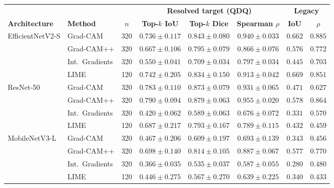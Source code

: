 \begin{tabular}{ll c ccc cc}
\toprule
 & & & \multicolumn{3}{c}{\textbf{Resolved target (QDQ)}} & \multicolumn{2}{c}{\textbf{Legacy}} \\
\cmidrule(lr){4-6} \cmidrule(lr){7-8}
\textbf{Architecture} & \textbf{Method} & \textbf{$n$} & \textbf{Top-$k$ IoU} & \textbf{Top-$k$ Dice} & \textbf{Spearman $\rho$} & \textbf{IoU} & \textbf{$\rho$} \\
\midrule
\multirow{4}{*}{EfficientNetV2-S}
 & Grad-CAM & 320 & $0.736 \pm 0.117$ & $0.843 \pm 0.080$ & $0.940 \pm 0.033$ & $0.662$ & $0.885$ \\
 & Grad-CAM++ & 320 & $0.667 \pm 0.106$ & $0.795 \pm 0.079$ & $0.866 \pm 0.076$ & $0.576$ & $0.772$ \\
 & Int.\ Gradients & 320 & $0.550 \pm 0.041$ & $0.709 \pm 0.034$ & $0.797 \pm 0.034$ & $0.445$ & $0.703$ \\
 & LIME & 120 & $0.742 \pm 0.205$ & $0.834 \pm 0.150$ & $0.913 \pm 0.042$ & $0.669$ & $0.851$ \\
\midrule
\multirow{4}{*}{ResNet-50}
 & Grad-CAM & 320 & $0.783 \pm 0.110$ & $0.873 \pm 0.079$ & $0.931 \pm 0.065$ & $0.471$ & $0.627$ \\
 & Grad-CAM++ & 320 & $0.790 \pm 0.094$ & $0.879 \pm 0.063$ & $0.955 \pm 0.020$ & $0.578$ & $0.864$ \\
 & Int.\ Gradients & 320 & $0.420 \pm 0.062$ & $0.589 \pm 0.063$ & $0.676 \pm 0.072$ & $0.331$ & $0.570$ \\
 & LIME & 120 & $0.687 \pm 0.217$ & $0.793 \pm 0.167$ & $0.789 \pm 0.115$ & $0.432$ & $0.459$ \\
\midrule
\multirow{4}{*}{MobileNetV3-L}
 & Grad-CAM & 320 & $0.467 \pm 0.206$ & $0.609 \pm 0.197$ & $0.693 \pm 0.139$ & $0.343$ & $0.456$ \\
 & Grad-CAM++ & 320 & $0.698 \pm 0.140$ & $0.814 \pm 0.105$ & $0.887 \pm 0.067$ & $0.577$ & $0.770$ \\
 & Int.\ Gradients & 320 & $0.366 \pm 0.035$ & $0.535 \pm 0.037$ & $0.587 \pm 0.055$ & $0.280$ & $0.480$ \\
 & LIME & 120 & $0.446 \pm 0.275$ & $0.567 \pm 0.270$ & $0.639 \pm 0.225$ & $0.340$ & $0.433$ \\
\bottomrule
\end{tabular}
